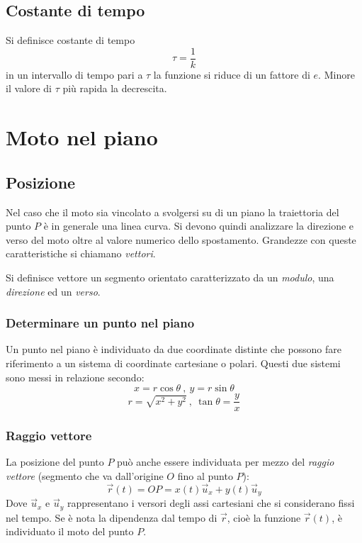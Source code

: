\documentclass[class=book, crop=false, oneside, 12pt]{standalone}
\begin{document}
	\subsection{Costante di tempo}
	Si definisce costante di tempo
	$$\tau = \dfrac{1}{k}$$
	in un intervallo di tempo pari a $\tau$ la funzione si riduce di un fattore di $e$. %
	Minore il valore di $\tau$ pi\`u rapida la decrescita.

\section{Moto nel piano}
  \subsection{Posizione}
  Nel caso che il moto sia vincolato a svolgersi su di un piano la traiettoria del punto $P$ è in generale  una linea curva.
  Si devono quindi analizzare la direzione e verso del moto oltre al valore numerico dello spostamento.
  Grandezze con queste caratteristiche si chiamano \emph{vettori}.

  Si definisce vettore un segmento orientato caratterizzato da un \emph{modulo}, una \emph{direzione} ed un \emph{verso}.
    \subsubsection{Determinare un punto nel piano}
    Un punto nel piano \`e individuato da due coordinate distinte che possono fare riferimento a un sistema di coordinate cartesiane o polari.
    Questi due sistemi sono messi in relazione secondo:
    \begin{equation}
      x = r \cos \theta \ , \ y = r \sin \theta
    \end{equation}
    \begin{equation}
      r = \sqrt{x^2 + y^2 } \ , \ \tan \theta = \frac{y}{x}
    \end{equation}
    \subsubsection{Raggio vettore}
    La posizione del punto \(P\) può anche essere individuata per mezzo del \emph{raggio vettore} (segmento che va dall'origine \(O\) fino al punto \(P\)):
    \begin{equation}
      \overrightarrow{r}(t) = OP = x(t) \overrightarrow{u}_x + y(t) \overrightarrow{u}_y
    \end{equation}
    Dove \(\overrightarrow{u}_x\) e \(\overrightarrow{u}_y\) rappresentano i versori degli assi cartesiani che si considerano fissi nel tempo.
    Se è nota la dipendenza dal tempo di \(\overrightarrow{r}\), cioè la funzione \(\overrightarrow{r}(t)\), è individuato il moto del punto \(P\).
\end{document}

